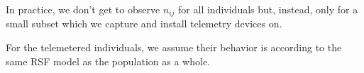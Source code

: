 In practice, we don't get to
observe $n_{ij}$ for all individuals but, instead, only for a small
subset which we capture and install telemetry devices on.

For the telemetered individuals, we assume their behavior is according
to the same RSF model as the population as a whole.


